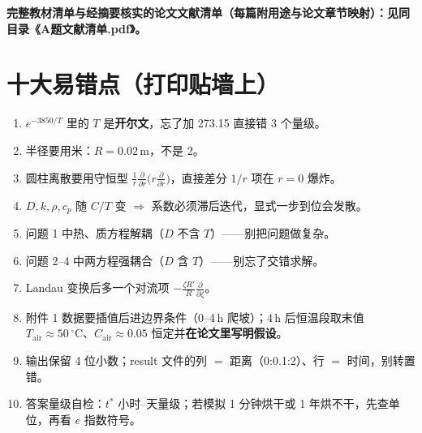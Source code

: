 \documentclass[12pt,a4paper]{ctexart}
\begin{document}
\textbf{完整教材清单与经摘要核实的论文文献清单（每篇附用途与论文章节映射）：见同目录《A题文献清单.pdf》。}

\section{十大易错点（打印贴墙上）}

\begin{enumerate}[leftmargin=2.5em]
\item $e^{-3850/T}$ 里的 $T$ 是\textbf{开尔文}，忘了加 273.15 直接错 3 个量级。
\item 半径要用米：$R=0.02$\,m，不是 2。
\item 圆柱离散要用守恒型 $\frac{1}{r}\frac{\partial}{\partial r}\big(r\frac{\partial}{\partial r}\big)$，直接差分 $1/r$ 项在 $r=0$ 爆炸。
\item $D,k,\rho,c_p$ 随 $C/T$ 变 $\Rightarrow$ 系数必须滞后迭代，显式一步到位会发散。
\item 问题 1 中热、质方程解耦（$D$ 不含 $T$）——别把问题做复杂。
\item 问题 2--4 中两方程强耦合（$D$ 含 $T$）——别忘了交错求解。
\item Landau 变换后多一个对流项 $-\frac{\zeta R'}{R}\frac{\partial}{\partial\zeta}$。
\item 附件 1 数据要插值后进边界条件（0--4\,h 爬坡）；4\,h 后恒温段取末值 $T_{\mathrm{air}}\approx50\,^\circ$C、$C_{\mathrm{air}}\approx0.05$ 恒定并\textbf{在论文里写明假设}。
\item 输出保留 4 位小数；result 文件的列 $=$ 距离（0:0.1:2）、行 $=$ 时间，别转置错。
\item 答案量级自检：$t^*$ 小时--天量级；若模拟 1 分钟烘干或 1 年烘不干，先查单位，再看 $e$ 指数符号。
\end{enumerate}
\end{document}
